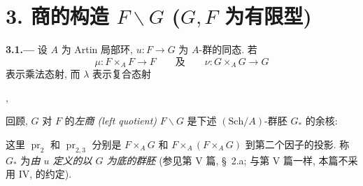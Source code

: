 
\section*{3. 商的构造 \(F\backslash G\)
  (\(G,F\) 为有限型)}
\label{sec:sga3-VIA-3}

\medskip
{}\label{par:sga3-VIA-3.1}%
\noindent\textbf{3.1.---}
设 \(A\) 为 Artin 局部环, \(u:F\to G\) 为 \(A\)-群的同态.
若
\[
  \mu:F\times_A F\longrightarrow F
  \qquad\text{及}\qquad
  \nu:G\times_A G\longrightarrow G
\]
表示乘法态射, 而 \(\lambda\) 表示复合态射
\begin{center}
  \label{diag:sga3-VIA-3.1-lambda-composite}%
  ,
\end{center}
回顾, \(G\) 对 \(F\) 的\emph{左商 (left quotient)} \(F\backslash G\)
是下述 \((\mathrm{Sch}/A)\)-群胚 \(G_*\) 的余核:
\begin{center}
  \label{diag:sga3-VIA-3.1-groupoid}%
\end{center}
这里 \(\operatorname{pr}_2\) 和 \(\operatorname{pr}_{2,3}\) 分别是
\(F\times_A G\) 和 \(F\times_A(F\times_A G)\) 到第二个因子的投影.
称 \(G_*\) 为\emph{由 \(u\) 定义的以 \(G\) 为底的群胚}
(参见第 V 篇, \S~2.a; 与第 V 篇一样, 本篇不采用
IV,  的约定).

